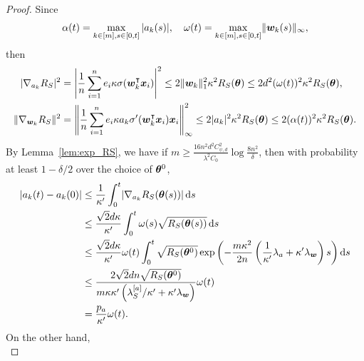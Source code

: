 \documentclass[twoside,11pt]{article}
\begin{document}
\begin{proof}
    Since
    \begin{equation*}
        \alpha(t)=\max\limits_{k\in[m],s\in[0,t]}|a_k(s)|, \quad \omega(t)=\max\limits_{k\in[m],s\in[0,t]}\lVert\bm{w}_k(s)\rVert_{\infty},
    \end{equation*}
    then
    \begin{equation*}
        \begin{aligned}
            \lvert\nabla_{a_k}R_S\rvert^2    & =\left\lvert\frac{1}{n}\sum_{i=1}^n e_i\kappa\sigma(\bm{w}_k^\intercal\bm{x}_i)\right\rvert^2\leq 2\lVert\bm{w}_k\rVert^2_1\kappa^2R_S(\bm{\theta})\leq 2d^2(\omega(t))^2\kappa^2R_S(\bm{\theta}),            \\
            \lVert\nabla_{\bm{w}_k}R_S\rVert^2 & =\left\lVert\frac{1}{n}\sum_{i=1}^n e_i\kappa a_k\sigma'(\bm{w}_k^\intercal\bm{x}_i)\bm{x}_i\right\rVert^2_{\infty}\leq 2\lvert a_k\rvert^2\kappa^2R_S(\bm{\theta})\leq 2(\alpha(t))^2\kappa^2R_S(\bm{\theta}).
        \end{aligned}
    \end{equation*}
    By Lemma~\ref{lem:exp_RS}, we have if $m\geq \frac{16n^2d^2C_{\psi,d}^2}{\lambda^2C_0}\log\frac{8n^2}{\delta}$, then with probability at least $1 - \delta/2$ over the choice of $\bm{\theta}^0$,
    \begin{equation*}
        \begin{aligned}
            \lvert a_k(t) - a_k(0)\rvert
             & \leq\frac{1}{\kappa'}\int_0^t\lvert\nabla_{a_k}R_S(\bm{\theta}(s))\rvert\mathop{}\!\mathrm{d}{s}                                                                                                                   \\
             & \leq\frac{\sqrt{2}d\kappa}{\kappa'}\int_{0}^{t} \omega(s)\sqrt{R_S(\bm{\theta}(s))}\mathop{}\!\mathrm{d}{s}                                                                                                  \\
             & \leq\frac{\sqrt{2}d\kappa}{\kappa'}\omega(t)\int_{0}^{t}\sqrt{R_S(\bm{\theta}^0)}\exp\left(-\frac{m\kappa^2}{2n}\left(\frac{1}{\kappa'}\lambda_a+\kappa'\lambda_{\bm{w}}\right)s\right)\mathop{}\!\mathrm{d}{s} \\
             & \leq \frac{2\sqrt{2}dn\sqrt{R_S(\bm{\theta}^0)}}{m\kappa\kappa'\left(\lambda^{[a]}_S/\kappa'+\kappa'\lambda_{\bm{w}}\right)}\omega(t)                                                           \\
             & =\frac{p_a}{\kappa'}\omega(t).
        \end{aligned}
    \end{equation*}
    On the other hand,
    \begin{equation*}

\end{equation*}
\end{proof}
\end{document}
